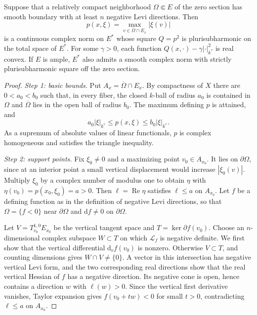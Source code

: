 \begin{theorem}\label{thm:concave-neighbourhood-dual-norm}
Suppose that a relatively compact neighborhood $\Omega\Subset E$ of the zero section has smooth boundary with at least $n$ negative Levi directions. Then
\[
 p(x,\xi)=\max_{v\in\overline\Omega\cap E_x}|\xi(v)|
\]
is a continuous complex norm on $E^*$ whose square $Q=p^2$ is plurisubharmonic on the total space of $E^*$. For some $\gamma>0$, each function $Q(x,\cdot)-\gamma|\cdot|_{k^*}^2$ is real convex. If $E$ is ample, $E^*$ also admits a smooth complex norm with strictly plurisubharmonic square off the zero section.
\end{theorem}
\begin{proof}
\emph{Step 1: basic bounds.} Put $A_x=\overline\Omega\cap E_x$. By compactness of $X$ there are $0<a_0<b_0$ such that, in every fiber, the closed $k$-ball of radius $a_0$ is contained in $\Omega$ and $\overline\Omega$ lies in the open ball of radius $b_0$. The maximum defining $p$ is attained, and
\[
 a_0|\xi|_{k^*}\leq p(x,\xi)\leq b_0|\xi|_{k^*}.
\]
As a supremum of absolute values of linear functionals, $p$ is complex homogeneous and satisfies the triangle inequality.

\emph{Step 2: support points.} Fix $\xi_0\ne0$ and a maximizing point $v_0\in A_{x_0}$. It lies on $\partial\Omega$, since at an interior point a small vertical displacement would increase $|\xi_0(v)|$. Multiply $\xi_0$ by a complex number of modulus one to obtain $\eta$ with $\eta(v_0)=p(x_0,\xi_0)=a>0$. Then $\ell=\operatorname{Re}\eta$ satisfies $\ell\leq a$ on $A_{x_0}$. Let $f$ be a defining function as in the definition of negative Levi directions, so that $\Omega=\{f<0\}$ near $\partial\Omega$ and $\mathrm df\ne0$ on $\partial\Omega$.

Let $V=T^{1,0}_{v_0}E_{x_0}$ be the vertical tangent space and $T=\ker\partial f(v_0)$. Choose an $n$-dimensional complex subspace $W\subset T$ on which $\mathcal L_f$ is negative definite. We first show that the vertical differential $\mathrm d_vf(v_0)$ is nonzero. Otherwise $V\subset T$, and counting dimensions gives $W\cap V\ne\{0\}$. A vector in this intersection has negative vertical Levi form, and the two corresponding real directions show that the real vertical Hessian of $f$ has a negative direction. Its negative cone is open, hence contains a direction $w$ with $\ell(w)>0$. Since the vertical first derivative vanishes, Taylor expansion gives $f(v_0+tw)<0$ for small $t>0$, contradicting $\ell\leq a$ on $A_{x_0}$.


\end{proof}
